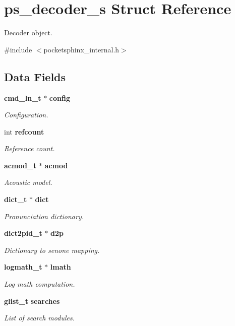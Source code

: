 \section{ps\-\_\-decoder\-\_\-s \-Struct \-Reference}
\label{structps__decoder__s}


\-Decoder object.  




{\ttfamily \#include $<$pocketsphinx\-\_\-internal.\-h$>$}

\subsection*{\-Data \-Fields}
\begin{DoxyCompactItemize}
\item 
{\bf cmd\-\_\-ln\-\_\-t} $\ast$ {\bf config}
\begin{DoxyCompactList}\small\item\em \-Configuration. \end{DoxyCompactList}\item 
int {\bf refcount}
\begin{DoxyCompactList}\small\item\em \-Reference count. \end{DoxyCompactList}\item 
{\bf acmod\-\_\-t} $\ast$ {\bf acmod}
\begin{DoxyCompactList}\small\item\em \-Acoustic model. \end{DoxyCompactList}\item 
{\bf dict\-\_\-t} $\ast$ {\bf dict}
\begin{DoxyCompactList}\small\item\em \-Pronunciation dictionary. \end{DoxyCompactList}\item 
{\bf dict2pid\-\_\-t} $\ast$ {\bf d2p}
\begin{DoxyCompactList}\small\item\em \-Dictionary to senone mapping. \end{DoxyCompactList}\item 
{\bf logmath\-\_\-t} $\ast$ {\bf lmath}
\begin{DoxyCompactList}\small\item\em \-Log math computation. \end{DoxyCompactList}\item 
{\bf glist\-\_\-t} {\bf searches}
\begin{DoxyCompactList}\small\item\em \-List of search modules. \end{DoxyCompactList}\item 

\end{DoxyCompactItemize}
